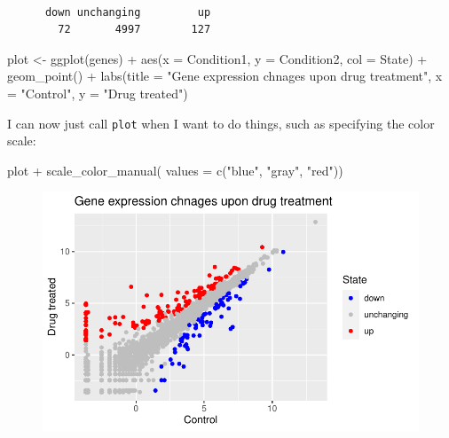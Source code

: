 \documentclass[
  letterpaper,
  DIV=11,
  numbers=noendperiod]{scrartcl}
\newenvironment{Shaded}{\begin{snugshade}}{\end{snugshade}}
\newcommand{\AttributeTok}[1]{\textcolor[rgb]{0.40,0.45,0.13}{#1}}
\newcommand{\FunctionTok}[1]{\textcolor[rgb]{0.28,0.35,0.67}{#1}}
\newcommand{\NormalTok}[1]{\textcolor[rgb]{0.00,0.23,0.31}{#1}}
\newcommand{\OtherTok}[1]{\textcolor[rgb]{0.00,0.23,0.31}{#1}}
\newcommand{\SpecialCharTok}[1]{\textcolor[rgb]{0.37,0.37,0.37}{#1}}
\newcommand{\StringTok}[1]{\textcolor[rgb]{0.13,0.47,0.30}{#1}}
\begin{document}
\begin{verbatim}

      down unchanging         up 
        72       4997        127 
\end{verbatim}

\begin{Shaded}
\begin{Highlighting}[]
\NormalTok{plot }\OtherTok{\textless{}{-}} \FunctionTok{ggplot}\NormalTok{(genes) }\SpecialCharTok{+}
          \FunctionTok{aes}\NormalTok{(}\AttributeTok{x =}\NormalTok{ Condition1, }\AttributeTok{y =}\NormalTok{ Condition2, }\AttributeTok{col =}\NormalTok{ State) }\SpecialCharTok{+}
          \FunctionTok{geom\_point}\NormalTok{() }\SpecialCharTok{+}
          \FunctionTok{labs}\NormalTok{(}\AttributeTok{title =} \StringTok{"Gene expression chnages upon drug treatment"}\NormalTok{,}
               \AttributeTok{x =} \StringTok{"Control"}\NormalTok{, }\AttributeTok{y =} \StringTok{"Drug treated"}\NormalTok{)}
\end{Highlighting}
\end{Shaded}

I can now just call \texttt{plot} when I want to do things, such as
specifying the color scale:

\begin{Shaded}
\begin{Highlighting}[]
\NormalTok{plot }\SpecialCharTok{+} \FunctionTok{scale\_color\_manual}\NormalTok{( }\AttributeTok{values =} \FunctionTok{c}\NormalTok{(}\StringTok{"blue"}\NormalTok{, }\StringTok{"gray"}\NormalTok{, }\StringTok{"red"}\NormalTok{))}
\end{Highlighting}
\end{Shaded}

\begin{figure}[H]

{\centering \includegraphics{class05_files/figure-pdf/unnamed-chunk-11-1.pdf}

}

\end{figure}
\end{document}
